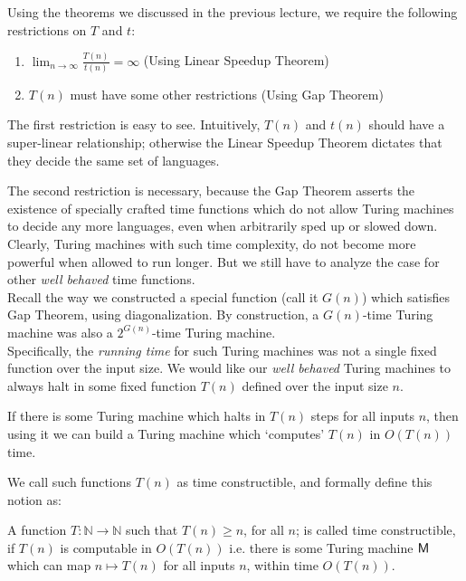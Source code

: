 \documentclass[usletter]{article}
\newcommand {\namedset}[1]     {\ensuremath{\mathbb{#1}}}
\newcommand {\machine}[1]      {\ensuremath{\textnormal{\textsf{#1}}}}
\newcommand {\term}[1]      {\textsf{#1}}
\newcommand {\namethm}[1]   {\term{#1} Theorem}
\newcommand {\usingthm}[1]  {(Using \namethm{#1})}
\begin{document}
\noindent
 Using the theorems we discussed in the previous lecture, we require the
 following restrictions on $T$ and $t$:

\begin{enumerate}
  \item $ \lim_{n \to \infty} \frac{T(n)}{t(n)} = \infty $ \hfill
    \usingthm{Linear Speedup}
  \item $T(n)$ must have some other restrictions \hfill \usingthm{Gap}
\end{enumerate}

\noindent
The first restriction is easy to see. Intuitively, $T(n)$ and $t(n)$ should have
a super-linear relationship; otherwise the \namethm{Linear Speedup} dictates
that they decide the same set of languages.

The second restriction is necessary, because the \namethm{Gap} asserts the
existence of specially crafted time functions which do not allow Turing machines
to decide any more languages, even when arbitrarily sped up or slowed down.
Clearly, Turing machines with such time complexity, do not become more powerful
when allowed to run longer. But we still have to analyze the case for other
\textit{well behaved} time functions.  \\

\noindent
Recall the way we constructed a special function (call it $G(n)$) which
satisfies \namethm{Gap}, using diagonalization. By construction, a $G(n)$-time
Turing machine was also a $2^{G(n)}$-time Turing machine. \\
Specifically, the \textit{running time} for such Turing machines was not a
single fixed function over the input size. We would like our
\textit{well behaved} Turing machines to always halt in some fixed function
$T(n)$ defined over the input size $n$.

\begin{remark}
If there is some Turing machine which halts in $T(n)$ steps for all inputs $n$,
then using it we can build a Turing machine which `computes' $T(n)$ in $O(T(n))$
time.
\end{remark}

\noindent
We call such functions $T(n)$ as \term{time constructible}, and formally define
this notion as:

\begin{definition}
A function $T: \namedset{N} \to \namedset{N}$ such that $T(n) \geq n$, for all
$n$; is called time constructible, if $T(n)$ is computable in $O(T(n))$ i.e.
there is some Turing machine \machine{M} which can map $n \mapsto T(n)$ for all
inputs $n$, within time $O(T(n))$.
\end{definition}
\end{document}
